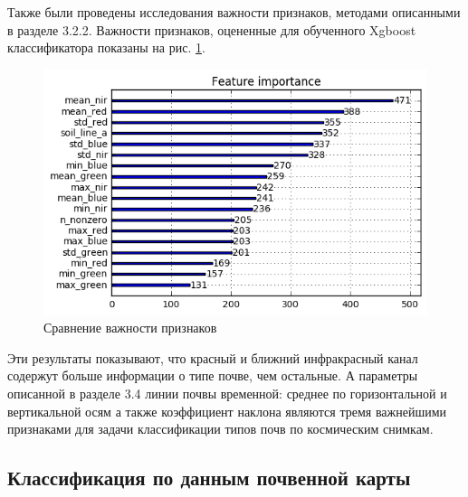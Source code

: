 \documentclass[14pt]{extarticle}
\begin{document}
Также были проведены исследования важности признаков, методами описанными в разделе 3.2.2.
Важности признаков, оцененные для обученного Xgboost классификатора показаны на рис. 
\ref{image:cuts_importance}.
\begin{figure}[H]
\centering
\includegraphics[width=\linewidth]{imgs/cuts_importance.png}
\caption{Сравнение важности признаков}
\label{image:cuts_importance}
\end{figure}
Эти результаты показывают, что красный и ближний инфракрасный канал содержут больше информации
о типе почве, чем остальные. А параметры описанной в разделе 3.4 линии почвы временной:
среднее по горизонтальной и вертикальной осям а также коэффициент наклона являются тремя
важнейшими признаками для задачи классификации типов почв по космическим снимкам.

\subsection{Классификация по данным почвенной карты}
\end{document}
